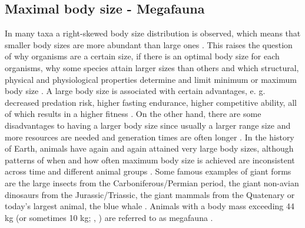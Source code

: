 \subsection{Maximal body size - Megafauna}
In many taxa a right-skewed body size distribution is observed, which means that smaller body sizes are more abundant than large ones \citep{Blackburn1994a,Kozlowski2002,Lyons2008}. This raises the question of why organisms are a certain size, if there is an optimal body size for each organisms, why some species attain larger sizes than others and which 
structural, physical and physiological properties determine and limit minimum or maximum body size
\citep{Smith2009}.
A large body size is associated with certain advantages, e. g. decreased predation risk, higher fasting endurance, higher competitive ability, all of which results in a higher fitness \citep{.}.
On the other hand, there are some disadvantages to having a larger body size since usually a larger range size and more resources are needed and generation times are often longer \citep{.}.
In the history of Earth, animals have again and again attained very large body sizes, although patterns of when and how often maximum body size is achieved are inconsistent across time and different animal groups \citep{Smith2016}.
Some famous examples of giant forms are the large insects from the Carboniferous/Permian period, the giant non-avian dinosaurs from the Jurassic/Triassic, the giant mammals from the Quatenary or today's largest animal, the blue whale \citep{.}.
Animals with a body mass exceeding 44 kg (or sometimes 10 kg; \citeauthor{Sandom2014}, \citeyear{Sandom2014}) are referred to as megafauna \citep{Barnosky2004, Rhodin2015}.
